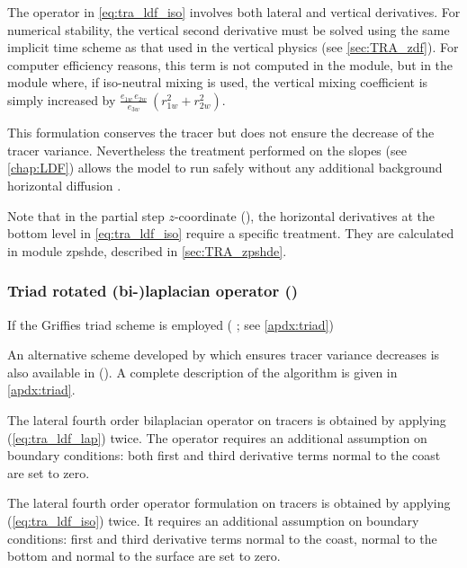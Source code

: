 \documentclass[../tex_main/NEMO_manual]{subfiles}
\begin{document}
The operator in \autoref{eq:tra_ldf_iso} involves both lateral and vertical 
derivatives. For numerical stability, the vertical second derivative must 
be solved using the same implicit time scheme as that used in the vertical 
physics (see \autoref{sec:TRA_zdf}). For computer efficiency reasons, this term 
is not computed in the  module, but in the  module 
where, if iso-neutral mixing is used, the vertical mixing coefficient is simply 
increased by $\frac{e_{1w}\,e_{2w} }{e_{3w} }\ \left( {r_{1w} ^2+r_{2w} ^2} \right)$. 

This formulation conserves the tracer but does not ensure the decrease 
of the tracer variance. Nevertheless the treatment performed on the slopes 
(see \autoref{chap:LDF}) allows the model to run safely without any additional 
background horizontal diffusion \citep{Guilyardi_al_CD01}. 

Note that in the partial step $z$-coordinate (), the horizontal derivatives 
at the bottom level in \autoref{eq:tra_ldf_iso} require a specific treatment. 
They are calculated in module zpshde, described in \autoref{sec:TRA_zpshde}.

\subsubsection{Triad rotated (bi-)laplacian operator (\protect{})}
\label{subsec:TRA_ldf_triad}

If the Griffies triad scheme is employed ( ; see \autoref{apdx:triad}) 

An alternative scheme developed by \cite{Griffies_al_JPO98} which ensures tracer variance decreases 
is also available in \NEMO (). A complete description of 
the algorithm is given in \autoref{apdx:triad}.

The lateral fourth order bilaplacian operator on tracers is obtained by 
applying (\autoref{eq:tra_ldf_lap}) twice. The operator requires an additional assumption 
on boundary conditions: both first and third derivative terms normal to the 
coast are set to zero.

The lateral fourth order operator formulation on tracers is obtained by 
applying (\autoref{eq:tra_ldf_iso}) twice. It requires an additional assumption 
on boundary conditions: first and third derivative terms normal to the 
coast, normal to the bottom and normal to the surface are set to zero. 
\end{document}
